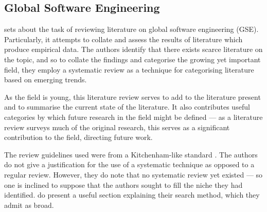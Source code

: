 \subsection{Global Software Engineering}
\citet*{Smite2010} sets about the task of reviewing literature on global software engineering (GSE). Particularly, it attempts to collate and assess the results of literature which produce empirical data. The authors identify that there exists scarce literature on the topic, and so to collate the findings and categorise the growing yet important field, they employ a systematic review as a technique for categorising literature based on emerging trends.\par

As the field is young, this literature review serves to add to the literature present and to summarise the current state of the literature. It also contributes useful categories by which future research in the field might be defined --- as a literature review surveys much of the original research, this serves as a significant contribution to the field, directing future work.\par

The review guidelines used were from a Kitchenham-like standard \citep{Kitchenham2007}. The authors do not give a justification for the use of a systematic technique as opposed to a regular review. However, they do note that no systematic review yet existed --- so one is inclined to suppose that the authors sought to fill the niche they had identified. \citeauthor{Smite2010} do present a useful section explaining their search method, which they admit as broad.\par

